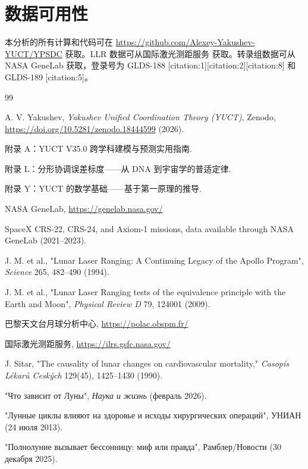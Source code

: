 \documentclass[12pt,a4paper]{article}
\theoremstyle{remark}
\begin{document}
	\section*{数据可用性}
	
	本分析的所有计算和代码可在 \url{https://github.com/Alexey-Yakushev-YUCT/YPSDC} 获取。LLR 数据可从国际激光测距服务 \cite{ILRS} 获取。转录组数据可从 NASA GeneLab \cite{NASA-GeneLab} 获取，登录号为 GLDS-188 [citation:1][citation:2][citation:8] 和 GLDS-189 [citation:5]。
	
	\begin{thebibliography}{99}
		
		A. V. Yakushev, \emph{Yakushev Unified Coordination Theory (YUCT)}, Zenodo, \url{https://doi.org/10.5281/zenodo.18444599} (2026).
		
		附录 A：YUCT V35.0 跨学科建模与预测实用指南.
		
		附录 L：分形协调误差标度——从 DNA 到宇宙学的普适定律.
		
		附录 Y：YUCT 的数学基础——基于第一原理的推导.
		
		NASA GeneLab, \url{https://genelab.nasa.gov/}
		
		SpaceX CRS-22, CRS-24, and Axiom-1 missions, data available through NASA GeneLab (2021–2023).
		
		J. M. et al., "Lunar Laser Ranging: A Continuing Legacy of the Apollo Program", \emph{Science} 265, 482–490 (1994).
		
		J. M. et al., "Lunar Laser Ranging tests of the equivalence principle with the Earth and Moon", \emph{Physical Review D} 79, 124001 (2009).
		
		巴黎天文台月球分析中心, \url{https://polac.obspm.fr/}
		
		国际激光测距服务, \url{https://ilrs.gsfc.nasa.gov/}
		
		J. Sitar, "The causality of lunar changes on cardiovascular mortality," \emph{Casopís Lékarů Ceských} 129(45), 1425–1430 (1990).
		
		"Что зависит от Луны", \emph{Наука и жизнь} (февраль 2026).
		
		"Лунные циклы влияют на здоровье и исходы хирургических операций", УНИАН (24 июля 2013).
		
		"Полнолуние вызывает бессонницу: миф или правда", Рамблер/Новости (30 декабря 2025).
		

\end{thebibliography}
\end{document}
